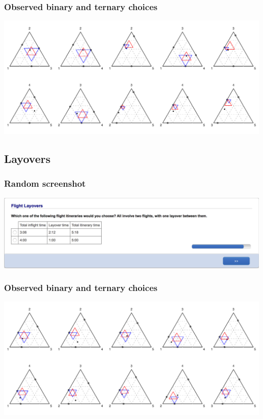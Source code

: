 \documentclass[11pt,letter]{article}
\begin{document}
\subsubsection*{Observed binary and ternary choices}

\includegraphics[width=15cm]{./Population_study_data/Simplexes/Restaurants.pdf}

\pagebreak

\subsection*{Layovers}



\subsubsection*{Random screenshot}

\includegraphics[width=15cm]{Population_study_design/screenshot_Flight_Layovers.png}

\subsubsection*{Observed binary and ternary choices}

\includegraphics[width=15cm]{./Population_study_data/Simplexes/Flight_layovers.pdf}
\end{document}
